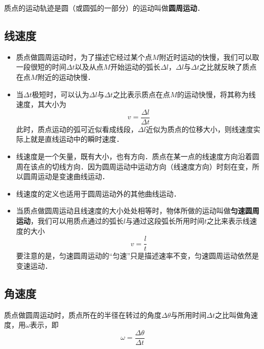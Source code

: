 
\begin{issues}
\issueDraft
\issueTODO
\end{issues}

质点的运动轨迹是圆（或圆弧的一部分）的运动叫做\textbf{圆周运动}．

\subsection{线速度}

\begin{itemize}
\item 质点做圆周运动时，为了描述它经过某个点$M$附近时运动的快慢，我们可以取一段很短的时间$\Delta t$以及从点$M$开始运动的弧长$\Delta l$，$\Delta l$与$\Delta t$之比就反映了质点在点$M$附近的运动快慢．

\item 当$\Delta t$极短时，可以认为$\Delta l$与$\Delta t$之比表示质点在点$M$的运动快慢，将其称为线速度，其大小为
\begin{equation}
v=\frac{\Delta l}{\Delta t}
\end{equation}
此时，质点运动的弧可近似看成线段，$\Delta l$近似为质点的位移大小，则线速度实际上就是直线运动中的瞬时速度．

\item 线速度是一个矢量，既有大小，也有方向．质点在某一点的线速度方向沿着圆周在该点的切线方向．因为圆周运动中运动方向（线速度方向）时刻在变，所以圆周运动是变速曲线运动．

\item 线速度的定义也适用于圆周运动外的其他曲线运动．

\item 当质点做圆周运动且线速度的大小处处相等时，物体所做的运动叫做\textbf{匀速圆周运动}，我们可以用质点通过的弧长$l$与通过这段弧长所用时间$t$之比来表示线速度的大小
\begin{equation}
v=\frac{l}{t}
\end{equation}
要注意的是，匀速圆周运动的“匀速”只是描述速率不变，匀速圆周运动依然是变速运动．
\end{itemize}

\subsection{角速度}

质点做圆周运动时，质点所在的半径在转过的角度$\Delta \theta$与所用时间$\Delta t$之比叫做角速度，用$\omega$表示，即
\begin{equation}
\omega = \frac{\Delta \theta}{\Delta t}
\end{equation}

